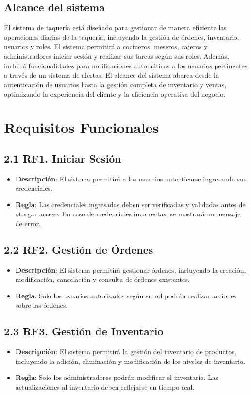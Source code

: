 \documentclass{article}
\begin{document}
\subsection{Alcance del sistema}

El sistema de taquería está diseñado para gestionar de manera eficiente las operaciones diarias de la taquería, incluyendo la gestión de órdenes, inventario, usuarios y roles. El sistema permitirá a cocineros, meseros, cajeros y administradores iniciar sesión y realizar sus tareas según sus roles. Además, incluirá funcionalidades para notificaciones automáticas a los usuarios pertinentes a través de un sistema de alertas. El alcance del sistema abarca desde la autenticación de usuarios hasta la gestión completa de inventario y ventas, optimizando la experiencia del cliente y la eficiencia operativa del negocio.

\newpage
\section{Requisitos Funcionales}
\subsection{2.1 RF1. Iniciar Sesión}
\begin{itemize}
    \item \textbf{Descripción}: El sistema permitirá a los usuarios autenticarse ingresando sus credenciales.
    \item \textbf{Regla}: Las credenciales ingresadas deben ser verificadas y validadas antes de otorgar acceso. En caso de credenciales incorrectas, se mostrará un mensaje de error.
\end{itemize}

\subsection{2.2 RF2. Gestión de Órdenes}
\begin{itemize}
    \item \textbf{Descripción}: El sistema permitirá gestionar órdenes, incluyendo la creación, modificación, cancelación y consulta de órdenes existentes.
    \item \textbf{Regla}: Solo los usuarios autorizados según su rol podrán realizar acciones sobre las órdenes.
\end{itemize}

\subsection{2.3 RF3. Gestión de Inventario}
\begin{itemize}
    \item \textbf{Descripción}: El sistema permitirá la gestión del inventario de productos, incluyendo la adición, eliminación y modificación de los niveles de inventario.
    \item \textbf{Regla}: Solo los administradores podrán modificar el inventario. Las actualizaciones al inventario deben reflejarse en tiempo real.
\end{itemize}
\end{document}
